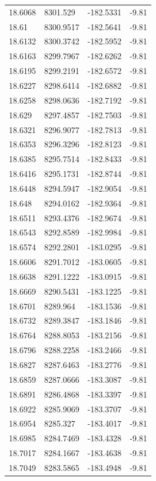 \begin{table}[H]
\begin{tabular}{llll}
18.6068 & 8301.529 & -182.5331 & -9.81 \\
18.61 & 8300.9517 & -182.5641 & -9.81 \\
18.6132 & 8300.3742 & -182.5952 & -9.81 \\
18.6163 & 8299.7967 & -182.6262 & -9.81 \\
18.6195 & 8299.2191 & -182.6572 & -9.81 \\
18.6227 & 8298.6414 & -182.6882 & -9.81 \\
18.6258 & 8298.0636 & -182.7192 & -9.81 \\
18.629 & 8297.4857 & -182.7503 & -9.81 \\
18.6321 & 8296.9077 & -182.7813 & -9.81 \\
18.6353 & 8296.3296 & -182.8123 & -9.81 \\
18.6385 & 8295.7514 & -182.8433 & -9.81 \\
18.6416 & 8295.1731 & -182.8744 & -9.81 \\
18.6448 & 8294.5947 & -182.9054 & -9.81 \\
18.648 & 8294.0162 & -182.9364 & -9.81 \\
18.6511 & 8293.4376 & -182.9674 & -9.81 \\
18.6543 & 8292.8589 & -182.9984 & -9.81 \\
18.6574 & 8292.2801 & -183.0295 & -9.81 \\
18.6606 & 8291.7012 & -183.0605 & -9.81 \\
18.6638 & 8291.1222 & -183.0915 & -9.81 \\
18.6669 & 8290.5431 & -183.1225 & -9.81 \\
18.6701 & 8289.964 & -183.1536 & -9.81 \\
18.6732 & 8289.3847 & -183.1846 & -9.81 \\
18.6764 & 8288.8053 & -183.2156 & -9.81 \\
18.6796 & 8288.2258 & -183.2466 & -9.81 \\
18.6827 & 8287.6463 & -183.2776 & -9.81 \\
18.6859 & 8287.0666 & -183.3087 & -9.81 \\
18.6891 & 8286.4868 & -183.3397 & -9.81 \\
18.6922 & 8285.9069 & -183.3707 & -9.81 \\
18.6954 & 8285.327 & -183.4017 & -9.81 \\
18.6985 & 8284.7469 & -183.4328 & -9.81 \\
18.7017 & 8284.1667 & -183.4638 & -9.81 \\
18.7049 & 8283.5865 & -183.4948 & -9.81 \\

\end{tabular}
\end{table}
